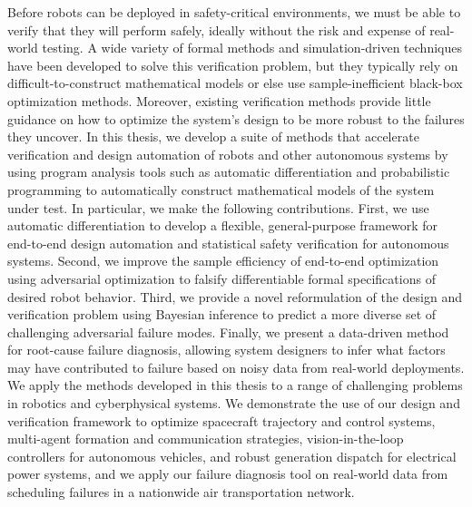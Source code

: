 %
%

Before robots can be deployed in safety-critical environments, we must be able to verify that they will perform safely, ideally without the risk and expense of real-world testing. A wide variety of formal methods and simulation-driven techniques have been developed to solve this verification problem, but they typically rely on difficult-to-construct mathematical models or else use sample-inefficient black-box optimization methods. Moreover, existing verification methods provide little guidance on how to optimize the system's design to be more robust to the failures they uncover.
%
In this thesis, we develop a suite of methods that accelerate verification and design automation of robots and other autonomous systems by using program analysis tools such as automatic differentiation and probabilistic programming to automatically construct mathematical models of the system under test. In particular, we make the following contributions. First, we use automatic differentiation to develop a flexible, general-purpose framework for end-to-end design automation and statistical safety verification for autonomous systems. Second, we improve the sample efficiency of end-to-end optimization using adversarial optimization to falsify differentiable formal specifications of desired robot behavior. Third, we provide a novel reformulation of the design and verification problem using Bayesian inference to predict a more diverse set of challenging adversarial failure modes. Finally, we present a data-driven method for root-cause failure diagnosis, allowing system designers to infer what factors may have contributed to failure based on noisy data from real-world deployments.
%
We apply the methods developed in this thesis to a range of challenging problems in robotics and cyberphysical systems. We demonstrate the use of our design and verification framework to optimize spacecraft trajectory and control systems, multi-agent formation and communication strategies, vision-in-the-loop controllers for autonomous vehicles, and robust generation dispatch for electrical power systems, and we apply our failure diagnosis tool on real-world data from scheduling failures in a nationwide air transportation network.